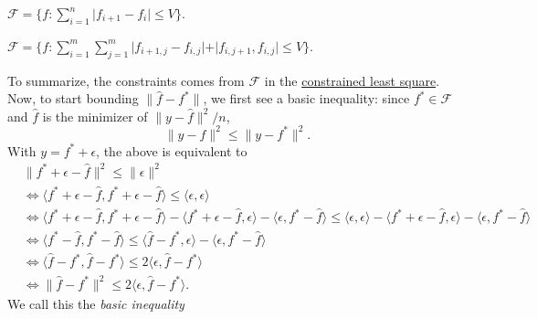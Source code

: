 \begin{eg}
	\(\mathscr{F} = \{f \colon \sum_{i = 1}^n \vert f_{i+1} - f_i \vert \leq V \} \).
\end{eg}

\begin{eg}
	\(\mathscr{F} = \{f \colon \sum_{i=1}^{m} \sum_{j=1}^{m} \vert f_{i+1, j} - f_{i, j} \vert + \vert f_{i, j+1} , f_{i, j} \vert \leq V \} \).
\end{eg}

To summarize, the constraints comes from \(\mathscr{F} \) in the \hyperref[prb:constrained-LS]{constrained least square}. Now, to start bounding \(\lVert \hat{f} - f^{\ast} \rVert \), we first see a basic inequality: since \(f^{\ast} \in \mathscr{F} \) and \(\hat{f} \) is the minimizer of \(\lVert y - \hat{f} \rVert ^2 / n \),
\[
	\lVert y - \hat{f} \rVert ^2 \leq \lVert y - f^{\ast} \rVert ^2.
\]
With \(y = f^{\ast} + \epsilon \), the above is equivalent to
\[
	\begin{split}
		     & \lVert f^{\ast} + \epsilon - \hat{f}  \rVert ^2 \leq \lVert \epsilon \rVert ^2                                                                                                                                                                                                                                                             \\
		&\iff \langle f^{\ast} + \epsilon - \hat{f} , f^{\ast} + \epsilon - \hat{f} \rangle \leq \langle \epsilon , \epsilon \rangle                                                                                                                                                                                                                     \\
		&\iff \langle f^{\ast} + \epsilon - \hat{f} , f^{\ast} + \epsilon - \hat{f} \rangle - \langle f^{\ast} + \epsilon - \hat{f}, \epsilon \rangle - \langle \epsilon , f^{\ast} - \hat{f} \rangle \leq \langle \epsilon , \epsilon \rangle - \langle f^{\ast} + \epsilon - \hat{f}, \epsilon \rangle - \langle \epsilon , f^{\ast} - \hat{f} \rangle \\
		&\iff \langle f^{\ast} - \hat{f} , f^{\ast} - \hat{f} \rangle \leq \langle \hat{f} - f^{\ast} , \epsilon \rangle - \langle \epsilon , f^{\ast} - \hat{f} \rangle                                                                                                                                                                                 \\
		&\iff \langle \hat{f} - f^{\ast} , \hat{f} - f^{\ast} \rangle \leq 2 \langle \epsilon , \hat{f} - f^{\ast} \rangle                                                                                                                                                                                                                               \\
		&\iff \lVert \hat{f} - f^{\ast}  \rVert ^2 \leq 2 \langle \epsilon , \hat{f} - f^{\ast}  \rangle .
	\end{split}
\]
We call this the \emph{basic inequality}

